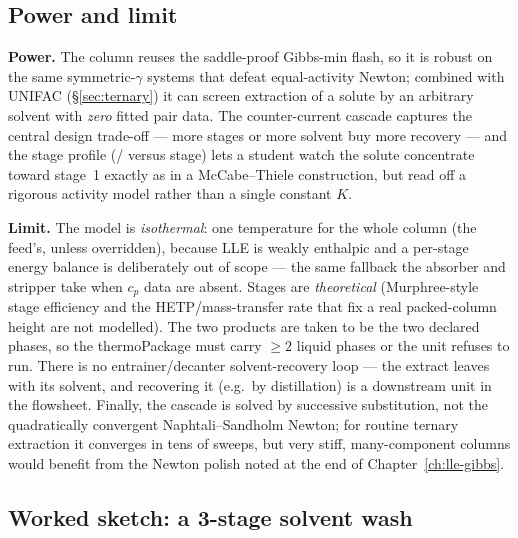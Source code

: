 \documentclass[11pt,a4paper]{article}
\begin{document}
\subsection*{Power and limit}

\textbf{Power.} The column reuses the saddle-proof Gibbs-min flash, so it
is robust on the same symmetric-$\gamma$ systems that defeat
equal-activity Newton; combined with UNIFAC (\S\ref{sec:ternary}) it can
screen extraction of a solute by an arbitrary solvent with \emph{zero}
fitted pair data. The counter-current cascade captures the central design
trade-off --- more stages or more solvent buy more recovery --- and the
stage profile (/ versus stage) lets a student watch
the solute concentrate toward stage~1 exactly as in a McCabe--Thiele
construction, but read off a rigorous activity model rather than a single
constant $K$.

\textbf{Limit.} The model is \emph{isothermal}: one temperature for the
whole column (the feed's, unless overridden), because LLE is weakly
enthalpic and a per-stage energy balance is deliberately out of scope ---
the same fallback the absorber and stripper take when $c_p$ data are
absent. Stages are \emph{theoretical} (Murphree-style stage efficiency
and the HETP/mass-transfer rate that fix a real packed-column height are
not modelled). The two products are taken to be the two declared
 phases, so the thermoPackage must carry $\ge 2$ liquid
phases or the unit refuses to run. There is no entrainer/decanter
solvent-recovery loop --- the extract leaves with its solvent, and
recovering it (e.g.\ by distillation) is a downstream unit in the
flowsheet. Finally, the cascade is solved by successive substitution, not
the quadratically convergent Naphtali--Sandholm Newton; for routine
ternary extraction it converges in tens of sweeps, but very stiff,
many-component columns would benefit from the Newton polish noted at the
end of Chapter~\ref{ch:lle-gibbs}.

\subsection*{Worked sketch: a 3-stage solvent wash}
\end{document}
